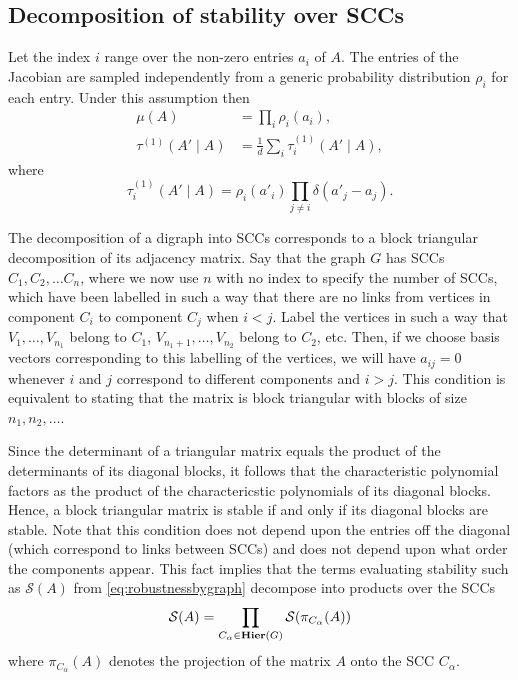 \subsection{Decomposition of stability over SCCs}
Let the index $i$ range over the non-zero entries $a_i$ of $A$. The entries of the Jacobian are sampled independently from a generic probability distribution $\rho_i$ for each entry. Under this assumption then
\begin{equation}\label{eq:singleresamplemutau}
\begin{aligned}
\mu(A) &= \prod_i \rho_i(a_i),\\
\tau^{(1)}(A' \mid A) &= \frac{1}{d} \sum_i \tau^{(1)}_i (A' \mid A),
\end{aligned}
\end{equation}
where
$$
\tau^{(1)}_i(A' \mid A) = \rho_i(a'_i) \prod_{j \neq i} \delta(a'_j - a_j).
$$

The decomposition of a digraph into SCCs corresponds to a block triangular decomposition of its adjacency matrix.  Say that the graph $G$ has SCCs $C_1, C_2, \ldots C_n$, where we now use $n$ with no index to specify the number of SCCs, which have been labelled in such a way that there are no links from vertices in component $C_i$ to component $C_j$ when $i < j$.  Label the vertices in such a way that $V_1, \ldots, V_{n_1}$ belong to $C_1$, $V_{n_1 + 1}, \ldots, V_{n_2}$ belong to $C_2$, etc.  Then, if we choose basis vectors corresponding to this labelling of the vertices, we will have $a_{ij} = 0$ whenever $i$ and $j$ correspond to different components and $i > j$.  This condition is equivalent to stating that the matrix is block triangular with blocks of size $n_1, n_2, \ldots$.

Since the determinant of a triangular matrix equals the product of the determinants of its diagonal blocks, it follows that the characteristic polynomial factors as the product of the charactericstic polynomials of its diagonal blocks.  Hence, a block triangular matrix is stable if and only if its diagonal blocks are stable.  Note that this condition does not depend upon the entries off the diagonal (which correspond to links between SCCs) and does not depend upon what order the components appear. This fact implies that the terms evaluating stability such as $\mathcal{S}(A)$ from \ref{eq:robustnessbygraph} decompose into products over the SCCs
\begin{equation}\label{eq:stabfactor}
\mathcal{S}(A) = \prod_{C_\alpha \in \mathbf{Hier}(G)} \mathcal{S}(\pi_{C_{\alpha}}(A))
\end{equation}
where $\pi_{C_{\alpha}}(A)$ denotes the projection of the matrix $A$ onto the SCC $C_{\alpha}$.

